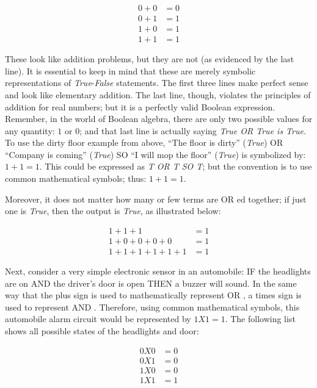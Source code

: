 \begin{align}
  \label{04eq01}
  0 + 0 &= 0 \\
  \nonumber
  0 + 1 &= 1 \\
  \nonumber
  1 + 0 &= 1 \\
  \nonumber
  1 + 1 &= 1
\end{align}

These look like addition problems, but they are not (as evidenced by the last line). It is essential to keep in mind that these are merely symbolic representations of \emph{True}-\emph{False} statements. The first three lines make perfect sense and look like elementary addition. The last line, though, violates the principles of addition for real numbers; but it is a perfectly valid Boolean expression. Remember, in the world of Boolean algebra, there are only two possible values for any quantity: $ 1 $ or $ 0 $; and that last line is actually saying \emph{True \textsf{OR} True is True}. To use the dirty floor example from above, ``The floor is dirty'' (\emph{True}) OR ``Company is coming'' (\emph{True}) SO ``I will mop the floor'' (\emph{True}) is symbolized by: $ 1 + 1 = 1 $. This could be expressed as \emph{T \textsf{OR} T SO T}; but the convention is to use common mathematical symbols; thus: $ 1 + 1 = 1 $. 

Moreover, it does not matter how many or few terms are \textsf{OR} ed together; if just one is \emph{True}, then the output is \emph{True}, as illustrated below:

\begin{align}
  \label{04eq02}
  1 + 1 + 1 &= 1 \\
  \nonumber
  1 + 0 + 0 + 0 + 0 &= 1 \\
  \nonumber
  1 + 1 + 1 + 1 + 1 + 1 &= 1
\end{align}

Next, consider a very simple electronic sensor in an automobile: IF the headlights are on AND the driver's door is open THEN a buzzer will sound. In the same way that the plus sign is used to mathematically represent \textsf{OR} , a times sign is used to represent \textsf{AND} . Therefore, using common mathematical symbols, this automobile alarm circuit would be represented by $ 1 X 1 = 1 $. The following list shows all possible states of the headlights and door:

\begin{align}
  \label{04eq03}
  0 X 0 &= 0 \\
  \nonumber
  0 X 1 &= 0 \\
  \nonumber
  1 X 0 &= 0 \\
  \nonumber
  1 X 1 &= 1
\end{align}

